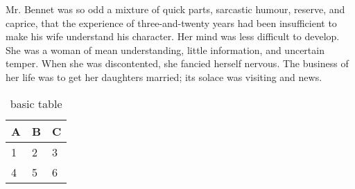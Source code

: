 Mr. Bennet was so odd a mixture of quick parts, sarcastic humour,
reserve, and caprice, that the experience of three-and-twenty
years had been insufficient to make his wife understand his
character. Her mind was less difficult to develop. She was a
woman of mean understanding, little information, and uncertain
temper. When she was discontented, she fancied herself nervous.
The business of her life was to get her daughters married; its
solace was visiting and news.
\begin{table}[h]
	\centering
	\begin{tabular}{l | l | l}
		A & B & C \\
		\hline
		1 & 2 & 3 \\
		4 & 5 & 6
	\end{tabular}
	\caption{basic table}
	\label{table_basic_table}
\end{table}
